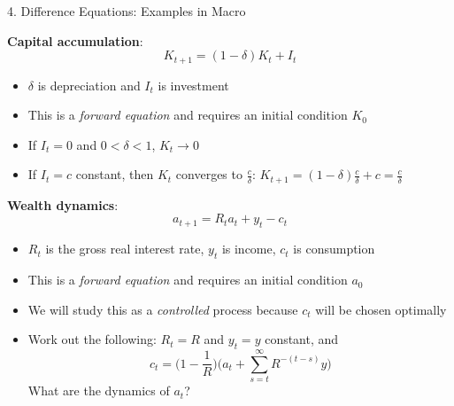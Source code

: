 \documentclass[10pt]{beamer}
\begin{document}
\begin{frame}{4. Difference Equations: Examples in Macro}

\textbf{Capital accumulation}:
\begin{equation*}
	K_{t+1} = (1 - \delta) K_t + I_t
\end{equation*}
\begin{itemize}
\item $\delta$ is depreciation and $I_t$ is investment

\item This is a \textit{forward equation} and requires an initial condition $K_0$

\item If $I_t = 0$ and $0 < \delta < 1$, $K_t \to 0$

\item If $I_t = c$ constant, then $K_t$ converges to $\frac{c}{\delta}$: $K_{t+1} = (1-\delta) \frac{c}{\delta} + c = \frac{c}{\delta}$
\end{itemize}
\end{frame}


\begin{frame}{}
\textbf{Wealth dynamics}:
\begin{equation*}
	a_{t+1} = R_t a_t + y_t - c_t
\end{equation*}
\begin{itemize}
	\item $R_t$ is the gross real interest rate, $y_t$ is income, $c_t$ is consumption
	
	\item This is a \textit{forward equation} and requires an initial condition $a_0$
	
	\item We will study this as a \textit{controlled} process because $c_t$ will be chosen optimally
	
	\item Work out the following: $R_t = R$ and $y_t = y$ constant, and  
	\begin{equation*}
		c_t = \bigg( 1 - \frac{1}{R} \bigg) \bigg(a_t + \sum_{s=t}^\infty R^{-(t-s)} y \bigg)
	\end{equation*}
	What are the dynamics of $a_t$?
\end{itemize}
\end{frame}
\end{document}
